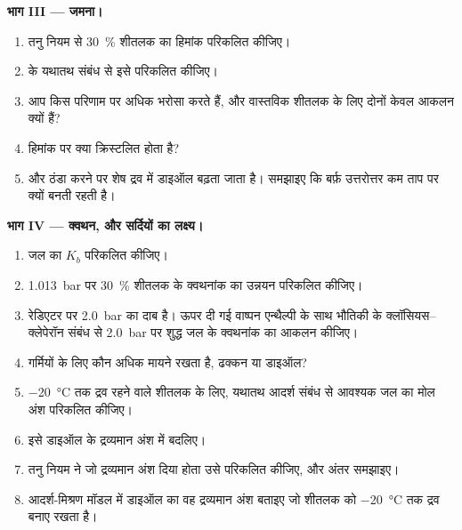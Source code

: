 \begin{problem}
\medskip
\noindent\textbf{भाग III --- जमना।}
\begin{enumerate}[resume]
  \item तनु नियम से \qty{30}{\percent} शीतलक का हिमांक
        परिकलित कीजिए।
  \item {} के यथातथ संबंध से इसे परिकलित कीजिए।
  \item आप किस परिणाम पर अधिक भरोसा करते हैं, और वास्तविक शीतलक के लिए दोनों केवल
        आकलन क्यों हैं?
  \item हिमांक पर क्या क्रिस्टलित होता है?
  \item और ठंडा करने पर शेष द्रव में डाइऑल बढ़ता जाता है। समझाइए
        कि बर्फ़ उत्तरोत्तर कम ताप पर क्यों बनती रहती है।
\end{enumerate}

\medskip
\noindent\textbf{भाग IV --- क्वथन, और सर्दियों का लक्ष्य।}
\begin{enumerate}[resume]
  \item जल का $K_b$ परिकलित कीजिए।
  \item \qty{1.013}{bar} पर \qty{30}{\percent} शीतलक के क्वथनांक का उन्नयन
        परिकलित कीजिए।
  \item रेडिएटर पर \qty{2.0}{bar} का दाब है। ऊपर दी गई वाष्पन एन्थैल्पी के साथ
        भौतिकी के क्लॉसियस--क्लेपेरॉन संबंध से
        \qty{2.0}{bar} पर शुद्ध जल के क्वथनांक का
        आकलन कीजिए।
  \item गर्मियों के लिए कौन अधिक मायने रखता है, ढक्कन या डाइऑल?
  \item \qty{-20}{\celsius} तक द्रव रहने वाले शीतलक के लिए, यथातथ आदर्श संबंध से
        आवश्यक जल का मोल अंश परिकलित कीजिए।
  \item इसे डाइऑल के द्रव्यमान अंश में बदलिए।
  \item तनु नियम ने जो द्रव्यमान अंश दिया होता उसे परिकलित कीजिए, और
        अंतर समझाइए।
  \item आदर्श-मिश्रण मॉडल में डाइऑल का वह द्रव्यमान अंश बताइए जो शीतलक को
        \qty{-20}{\celsius} तक द्रव बनाए रखता है।
\end{enumerate}
\end{problem}
